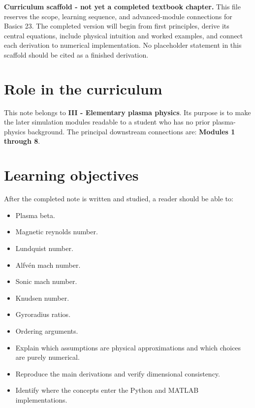 \documentclass[11pt]{article}
\begin{document}

\begin{overviewbox}
\textbf{Curriculum scaffold - not yet a completed textbook chapter.} This file reserves the scope, learning sequence, and advanced-module connections for Basics 23. The completed version will begin from first principles, derive its central equations, include physical intuition and worked examples, and connect each derivation to numerical implementation. No placeholder statement in this scaffold should be cited as a finished derivation.
\end{overviewbox}

\ProjectTOC

\section{Role in the curriculum}
This note belongs to \textbf{III - Elementary plasma physics}. Its purpose is to make the later simulation modules readable to a student who has no prior plasma-physics background. The principal downstream connections are: \textbf{Modules 1 through 8}.

\section{Learning objectives}
After the completed note is written and studied, a reader should be able to:
\begin{itemize}[leftmargin=1.6em]
\item Plasma beta.
\item Magnetic reynolds number.
\item Lundquist number.
\item Alfv\'en mach number.
\item Sonic mach number.
\item Knudsen number.
\item Gyroradius ratios.
\item Ordering arguments.
\item Explain which assumptions are physical approximations and which choices are purely numerical.
\item Reproduce the main derivations and verify dimensional consistency.
\item Identify where the concepts enter the Python and MATLAB implementations.
\end{itemize}
\end{document}

